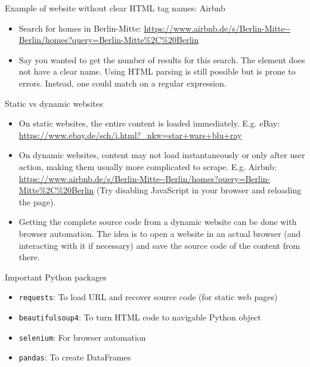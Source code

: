 \begin{frame}{Example of website without clear HTML tag names: Airbnb}
\begin{itemize}
	\item Search for homes in Berlin-Mitte: \url{https://www.airbnb.de/s/Berlin-Mitte--Berlin/homes?query=Berlin-Mitte\%2C\%20Berlin}
	\item Say you wanted to get the number of results for this search. The element does not have a clear name. Using HTML parsing is still possible but is prone to errors. Instead, one could match on a regular expression.
\end{itemize}

\end{frame}

\begin{frame}{Static vs dynamic websites}
\begin{itemize}
	\item On static websites, the entire content is loaded immediately. E.g. eBay: \url{https://www.ebay.de/sch/i.html?_nkw=star+wars+blu+ray}
	\item On dynamic websites, content may not load instantaneously or only after user action, making them usually more complicated to scrape. E.g. Airbnb: \url{https://www.airbnb.de/s/Berlin-Mitte--Berlin/homes?query=Berlin-Mitte\%2C\%20Berlin} (Try disabling JavaScript in your browser and reloading the page).
	\item Getting the complete source code from a dynamic website can be done with browser automation. The idea is to open a website in an actual browser (and interacting with it if necessary) and save the source code of the content from there.
\end{itemize}
\end{frame}

\begin{frame}{Important Python packages}
\begin{itemize}
	\item {\tt requests}: To load URL and recover source code (for static web pages)
	\item {\tt beautifulsoup4}: To turn HTML code to navigable Python object
	\item {\tt selenium}: For browser automation
	\item {\tt pandas}: To create DataFrames
\end{itemize}

\end{frame}